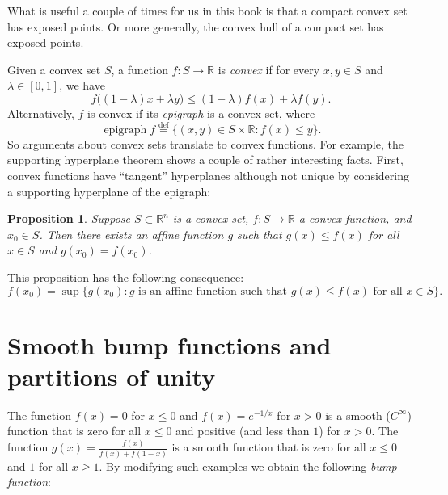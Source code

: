 \documentclass[12pt,openany]{book}
\newcommand{\R}{{\mathbb{R}}}
\newcommand{\myindex}[1]{#1\index{#1}}
\theoremstyle{plain}
\newtheorem{prop}[thm]{Proposition}
\theoremstyle{remark}
\theoremstyle{definition}
\theoremstyle{exercise}
\theoremstyle{example}
\begin{document}
What is useful a couple of times for us in this book is that a compact
convex set has exposed points.  Or more generally, the convex hull of a
compact set has exposed points.

Given a convex set $S$, a function $f \colon S \to \R$ is
\emph{convex} if
for every $x,y \in S$ and $\lambda \in [0,1]$, we have
\begin{equation*}
f\bigl((1-\lambda) x + \lambda y\bigr) \leq
(1-\lambda) f(x) + \lambda f(y) .
\end{equation*}
Alternatively, $f$ is convex if its \emph{\myindex{epigraph}}
is a convex set, where
\begin{equation*}
\operatorname{epigraph} f
\overset{\text{def}}{=}
\bigl\{ (x,y) \in S \times \R : f(x) \leq y \bigr\} .
\end{equation*}
So arguments about convex sets translate to convex functions.
For example,
the supporting hyperplane theorem shows a couple of rather interesting
facts.  First, convex functions have ``tangent'' hyperplanes although not
unique by considering a supporting hyperplane of the epigraph:

\begin{prop}
Suppose $S \subset \R^n$ is a convex set, $f \colon S \to \R$ a
convex function, and $x_0 \in S$.  Then there exists an affine function
$g$ such that $g(x) \leq f(x)$ for all $x \in S$ and $g(x_0) = f(x_0)$.
\end{prop}

This proposition has the following consequence:
\begin{equation*}
f(x_0) = \sup \bigl\{ g(x_0) : g \text{ is an affine function such that } g(x) \leq
f(x) \text{ for all } x \in S \bigr\} .
\end{equation*}


\section{Smooth bump functions and partitions of unity} \label{apsec:partofunity}

The function $f(x) = 0$ for $x \leq 0$ and $f(x) = e^{-1/x}$ for $x > 0$ is
a smooth ($C^\infty$) function that is zero for all $x \leq 0$ and positive
(and less than $1$)
for $x > 0$.  The function $g(x) = \frac{f(x)}{f(x)+f(1-x)}$ is a smooth
function that is zero for all $x \leq 0$ and $1$ for all $x \geq 1$.
By modifying such examples we obtain the following
\emph{\myindex{bump function}}:
\end{document}

